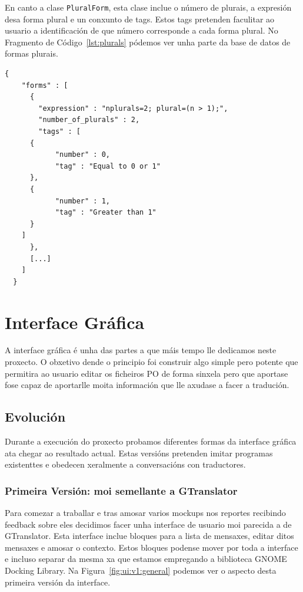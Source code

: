 En canto a clase \lstinline{PluralForm}, esta clase inclue o número de plurais, a expresión desa forma plural e un conxunto de tags. Estos tags pretenden faculitar ao usuario a identificación de que número corresponde a cada forma plural. No Fragmento de Código~\ref{lst:plurals} pódemos ver unha parte da base de datos de formas plurais.

\begin{lstlisting}[label=lst:plurals,caption=Fragmento da Base de Datos de Plurais]
  {
    "forms" : [
      {
        "expression" : "nplurals=2; plural=(n > 1);",
        "number_of_plurals" : 2,
        "tags" : [
	  {
            "number" : 0,
            "tag" : "Equal to 0 or 1"
	  },
	  {
            "number" : 1,
            "tag" : "Greater than 1"
	  }
	]
      },
      [...]
    ]
  }
\end{lstlisting}

\section{Interface Gráfica}
A interface gráfica é unha das partes a que máis tempo lle dedicamos neste proxecto. O obxetivo dende o principio foi construir algo simple pero potente que permitira ao usuario editar os ficheiros PO de forma sinxela pero que aportase fose capaz de aportarlle moita información que lle axudase a facer a tradución.

\subsection{Evolución}
Durante a execución do proxecto probamos diferentes formas da interface gráfica ata chegar ao resultado actual. Estas versións pretenden imitar programas existenttes e obedecen xeralmente a conversacións con traductores.

\subsubsection{Primeira Versión: moi semellante a GTranslator}
Para comezar a traballar e tras amosar varios mockups nos reportes recibindo feedback sobre eles decidimos facer unha interface de usuario moi parecida a de GTranslator. Esta interface inclue bloques para a lista de mensaxes, editar ditos mensaxes e amosar o contexto. Estos bloques podense mover por toda a interface e incluso separar da mesma xa que estamos empregando a biblioteca GNOME Docking Library. Na Figura~\ref{fig:ui:v1:general} podemos ver o aspecto desta primeira versión da interface.


